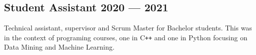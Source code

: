 

\subsection{Student Assistant \hfill 2020 --- 2021}
\vspace{0.7\baselineskip}

Technical assistant, supervisor and Scrum Master for Bachelor students. This was in the context of programing courses,
one in C\texttt{++} and one in Python focusing on Data Mining and Machine Learning.

\vspace{0.35\baselineskip}






